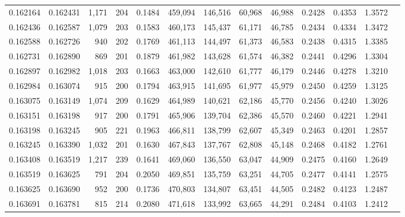\begin{tabular}{rrrrrrrrrrrrr}
0.162164 & 0.162431 & 1,171 & 204 &                                     0.1484 & 459,094 & 146,516 &  60,968 &  46,988 & 0.2428 & 0.4353 & 1.3572 \\
0.162436 & 0.162587 & 1,079 & 203 &                                     0.1583 & 460,173 & 145,437 &  61,171 &  46,785 & 0.2434 & 0.4334 & 1.3472 \\
0.162588 & 0.162726 &   940 & 202 &                                     0.1769 & 461,113 & 144,497 &  61,373 &  46,583 & 0.2438 & 0.4315 & 1.3385 \\
0.162731 & 0.162890 &   869 & 201 &                                     0.1879 & 461,982 & 143,628 &  61,574 &  46,382 & 0.2441 & 0.4296 & 1.3304 \\
0.162897 & 0.162982 & 1,018 & 203 &                                     0.1663 & 463,000 & 142,610 &  61,777 &  46,179 & 0.2446 & 0.4278 & 1.3210 \\
0.162984 & 0.163074 &   915 & 200 &                                     0.1794 & 463,915 & 141,695 &  61,977 &  45,979 & 0.2450 & 0.4259 & 1.3125 \\
0.163075 & 0.163149 & 1,074 & 209 &                                     0.1629 & 464,989 & 140,621 &  62,186 &  45,770 & 0.2456 & 0.4240 & 1.3026 \\
0.163151 & 0.163198 &   917 & 200 &                                     0.1791 & 465,906 & 139,704 &  62,386 &  45,570 & 0.2460 & 0.4221 & 1.2941 \\
0.163198 & 0.163245 &   905 & 221 &                                     0.1963 & 466,811 & 138,799 &  62,607 &  45,349 & 0.2463 & 0.4201 & 1.2857 \\
0.163245 & 0.163390 & 1,032 & 201 &                                     0.1630 & 467,843 & 137,767 &  62,808 &  45,148 & 0.2468 & 0.4182 & 1.2761 \\
0.163408 & 0.163519 & 1,217 & 239 &                                     0.1641 & 469,060 & 136,550 &  63,047 &  44,909 & 0.2475 & 0.4160 & 1.2649 \\
0.163519 & 0.163625 &   791 & 204 &                                     0.2050 & 469,851 & 135,759 &  63,251 &  44,705 & 0.2477 & 0.4141 & 1.2575 \\
0.163625 & 0.163690 &   952 & 200 &                                     0.1736 & 470,803 & 134,807 &  63,451 &  44,505 & 0.2482 & 0.4123 & 1.2487 \\
0.163691 & 0.163781 &   815 & 214 &                                     0.2080 & 471,618 & 133,992 &  63,665 &  44,291 & 0.2484 & 0.4103 & 1.2412 \\

\end{tabular}
